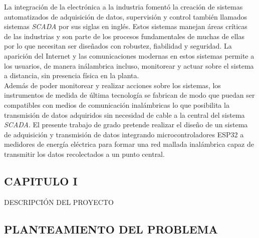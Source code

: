 \documentclass[12pt,letterpaper]{article}
\begin{document}
La integración de la electrónica a la industria fomentó la creación de sistemas automatizados de adquisición de datos, supervisión y control también llamados sistemas \textit{SCADA} por sus siglas en inglés. Estos sistemas manejan áreas críticas de las industrias y son parte de los procesos fundamentales de muchas de ellas por lo que necesitan ser diseñados con robustez, fiabilidad y seguridad. La aparición del Internet y las comunicaciones modernas en estos sistemas permite a los usuarios, de manera inálambrica incluso, monitorear y actuar sobre el sistema a distancia, sin presencia física en la planta.\\

Además de poder monitorear y realizar acciones sobre los sistemas, los instrumentos de medida de última tecnología se fabrican de modo que puedan ser compatibles con medios de comunicación inalámbricas lo que posibilita la transmisión de datos adquiridos sin necesidad de cable a la central del sistema \textit{SCADA}. El presente trabajo de grado pretende realizar el diseño de un sistema de adquisición y transmisión de datos integrando microcontroladores ESP32 a medidores de energía eléctrica para formar una red mallada inalámbrica capaz de transmitir los datos recolectados a un punto central.

\newpage

		
\begin{center}
	\section*{CAPITULO I} 	
\end{center}

\vspace{0.5cm}

	\begin{center}
			{\large DESCRIPCIÓN DEL PROYECTO}
	\end{center}

\vspace{0.5cm}

\begin{flushleft}
	
	\subsection*{ PLANTEAMIENTO DEL PROBLEMA}

\end{flushleft}

\vspace{0.3cm}
\end{document}

